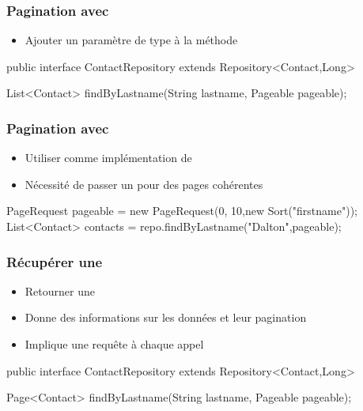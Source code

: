 \begin{frame}[fragile]
 \frametitle{Pagination avec }
 \begin{itemize}
  \item Ajouter un paramètre de type  à la méthode
 \end{itemize}
 \begin{javacode}
public interface ContactRepository extends Repository<Contact,Long> {

  List<Contact> findByLastname(String lastname, Pageable pageable);

}
 \end{javacode}
\end{frame}

\begin{frame}[fragile]
 \frametitle{Pagination avec }
 \begin{itemize}
  \item Utiliser  comme implémentation de 
  \item Nécessité de passer un  pour des pages cohérentes
 \end{itemize}
 \begin{javacode}
PageRequest pageable = new PageRequest(0, 10,new Sort("firstname"));
List<Contact> contacts = repo.findByLastname("Dalton",pageable);
 \end{javacode}
\end{frame}

\begin{frame}[fragile]
 \frametitle{Récupérer une }
 \begin{itemize}
  \item Retourner une 
  \item Donne des informations sur les données et leur pagination
  \item Implique une requête  à chaque appel
 \end{itemize}
 \begin{javacode}
public interface ContactRepository extends Repository<Contact,Long> {

  Page<Contact> findByLastname(String lastname, Pageable pageable);

}
 \end{javacode}
\end{frame}

